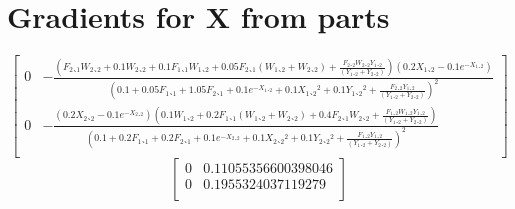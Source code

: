 \documentclass[landscape]{article}
\begin{document}
\section{Gradients for X from parts}
\begin{equation}
    \left[
    \begin{array}{cc}
    0 &  - \frac{\left( F{{_2}}ˏ{_1} W{{_2}}ˏ{_2} + 0.1 W{{_2}}ˏ{_2} + 0.1 F{{_1}}ˏ{_1} W{{_1}}ˏ{_2} + 0.05 F{{_2}}ˏ{_1} \left( W{{_1}}ˏ{_2} + W{{_2}}ˏ{_2} \right) + \frac{F{{_2}}ˏ{_2} W{{_2}}ˏ{_2} Y{{_1}}ˏ{_2}}{\left( Y{{_1}}ˏ{_2} + Y{{_2}}ˏ{_2} \right)} \right) \left( 0.2 X{{_1}}ˏ{_2} - 0.1 e^{ - X{{_1}}ˏ{_2}} \right)}{\left( 0.1 + 0.05 F{{_1}}ˏ{_1} + 1.05 F{{_2}}ˏ{_1} + 0.1 e^{ - X{{_1}}ˏ{_2}} + 0.1 X{{_1}}ˏ{_2}^{2} + 0.1 Y{{_1}}ˏ{_2}^{2} + \frac{F{{_2}}ˏ{_2} Y{{_1}}ˏ{_2}}{\left( Y{{_1}}ˏ{_2} + Y{{_2}}ˏ{_2} \right)} \right)^{2}} 
    \\
    0 &  - \frac{\left( 0.2 X{{_2}}ˏ{_2} - 0.1 e^{ - X{{_2}}ˏ{_2}} \right) \left( 0.1 W{{_1}}ˏ{_2} + 0.2 F{{_1}}ˏ{_1} \left( W{{_1}}ˏ{_2} + W{{_2}}ˏ{_2} \right) + 0.4 F{{_2}}ˏ{_1} W{{_2}}ˏ{_2} + \frac{F{{_1}}ˏ{_2} W{{_1}}ˏ{_2} Y{{_1}}ˏ{_2}}{\left( Y{{_1}}ˏ{_2} + Y{{_2}}ˏ{_2} \right)} \right)}{\left( 0.1 + 0.2 F{{_1}}ˏ{_1} + 0.2 F{{_2}}ˏ{_1} + 0.1 e^{ - X{{_2}}ˏ{_2}} + 0.1 X{{_2}}ˏ{_2}^{2} + 0.1 Y{{_2}}ˏ{_2}^{2} + \frac{F{{_1}}ˏ{_2} Y{{_1}}ˏ{_2}}{\left( Y{{_1}}ˏ{_2} + Y{{_2}}ˏ{_2} \right)} \right)^{2}} \\
    \end{array}
    \right]
    \end{equation}
    \begin{equation}
        \left[
        \begin{array}{cc}
        0 & 0.11055356600398046 \\
        0 & 0.1955324037119279 \\
        \end{array}
        \right]
        \end{equation}
\end{document}

